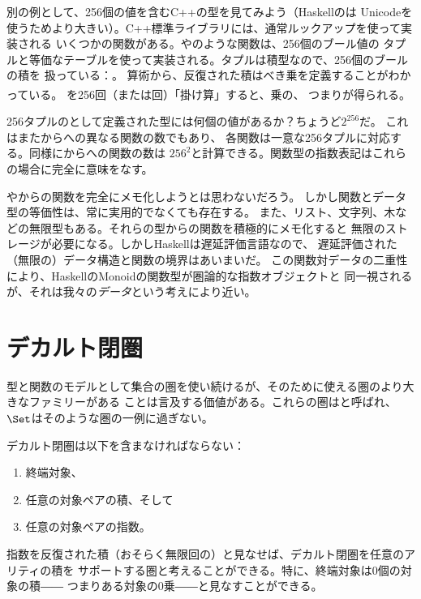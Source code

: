 別の例として、256個の値を含むC++の型を見てみよう（Haskellのは
Unicodeを使うためより大きい）。C++標準ライブラリには、通常ルックアップを使って実装される
いくつかの関数がある。やのような関数は、256個のブール値の
タプルと等価なテーブルを使って実装される。タプルは積型なので、256個のブールの積を
扱っている：。
算術から、反復された積はべき乗を定義することがわかっている。
を256回（または回）「掛け算」すると、乗の、
つまり\textsuperscript{}が得られる。

256タプルのとして定義された型には何個の値があるか？ちょうど$2^{256}$だ。
これはまたからへの異なる関数の数でもあり、
各関数は一意な256タプルに対応する。同様にからへの関数の数は
$256^{2}$と計算できる。関数型の指数表記はこれらの場合に完全に意味をなす。

やからの関数を完全にメモ化しようとは思わないだろう。
しかし関数とデータ型の等価性は、常に実用的でなくても存在する。
また、リスト、文字列、木などの無限型もある。それらの型からの関数を積極的にメモ化すると
無限のストレージが必要になる。しかしHaskellは遅延評価言語なので、
遅延評価された（無限の）データ構造と関数の境界はあいまいだ。
この関数対データの二重性により、HaskellのMonoidの関数型が圏論的な指数オブジェクトと
同一視されるが、それは我々の\emph{データ}という考えにより近い。

\section{デカルト閉圏}

型と関数のモデルとして集合の圏を使い続けるが、そのために使える圏のより大きなファミリーがある
ことは言及する価値がある。これらの圏はと呼ばれ、
$\Set$はそのような圏の一例に過ぎない。

デカルト閉圏は以下を含まなければならない：

\begin{enumerate}
  \tightlist
  \item
        終端対象、
  \item
        任意の対象ペアの積、そして
  \item
        任意の対象ペアの指数。
\end{enumerate}
指数を反復された積（おそらく無限回の）と見なせば、デカルト閉圏を任意のアリティの積を
サポートする圏と考えることができる。特に、終端対象は0個の対象の積――
つまりある対象の0乗――と見なすことができる。


